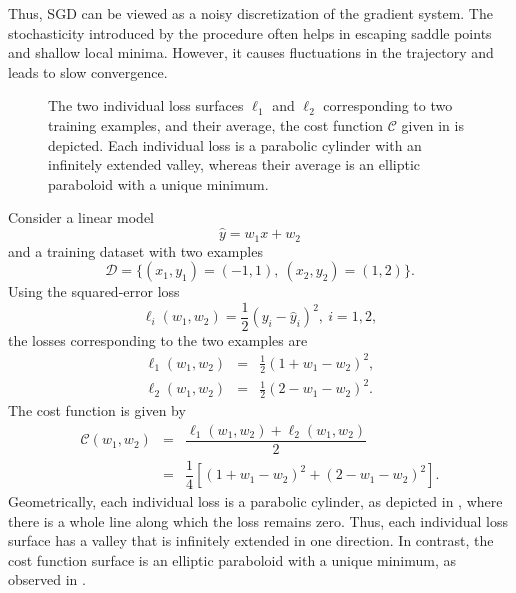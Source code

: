 Thus, SGD can be viewed as a noisy discretization of the gradient system. The  stochasticity introduced by the procedure often helps in escaping saddle points and shallow local minima. However, it causes fluctuations in the trajectory and leads to slow convergence.

\begin{center}
\begin{figure}

\caption{The two individual loss surfaces $\ell_1$ and $\ell_2$ corresponding to two training examples, and their average, the cost function $\mathcal{C}$ given in  is depicted. Each individual loss is a parabolic cylinder with an infinitely extended valley, whereas their average is an elliptic paraboloid with a unique minimum.}
\label{LossVsCost.fig}
\end{figure}
\end{center}
\begin{example}\label{LossVsCost.ex}

Consider a linear model 
$$ \widehat{y}=w_1x+w_2 $$ 
and a training dataset with two examples 
$$\mathcal{D} = \big\{ (x_1,y_1)=(-1,1),~ (x_2,y_2)=(1,2) \big\}. $$ 
Using the squared-error loss 
$$ \ell_i(w_1,w_2) = \frac{1}{2}\left(y_i-\widehat{y}_i\right)^2, ~i=1,2,$$ 
the losses corresponding to the two examples are 
$$\begin{array}{rcl} 
\ell_1(w_1,w_2) &=& \frac12(1+w_1-w_2)^2, \\
\ell_2(w_1,w_2) &=& \frac12(2-w_1-w_2)^2. 
\end{array}$$
The cost function is given by
$$\begin{array}{rcl} 
\mathcal{C}(w_1,w_2) &=& \dfrac{\ell_1(w_1,w_2)+\ell_2(w_1,w_2)}{2} \\ 
&=& \dfrac14\left[(1+w_1-w_2)^2 +(2-w_1-w_2)^2\right]. 
\end{array}$$
Geometrically, each individual loss is a parabolic cylinder, as depicted in , where there is a whole line along which the loss remains zero. Thus, each individual loss surface has a valley that is infinitely extended in one direction. In contrast, the cost function surface is an elliptic paraboloid with a unique minimum, as observed in . 
\end{example}

